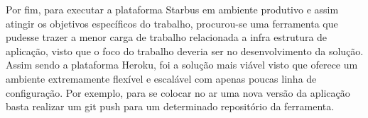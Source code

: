 Por fim, para executar a plataforma Starbus em ambiente produtivo e assim atingir os objetivos específicos do trabalho, procurou-se uma ferramenta que 
pudesse trazer a menor carga de trabalho relacionada a infra estrutura de aplicação, visto que o foco do trabalho deveria ser no desenvolvimento da solução. 
Assim sendo a plataforma Heroku, foi a solução mais viável visto que oferece um ambiente extremamente flexível e escalável com apenas poucas linha de configuração. 
Por exemplo, para se colocar no ar uma nova versão da aplicação basta realizar um git push para um determinado repositório da ferramenta.